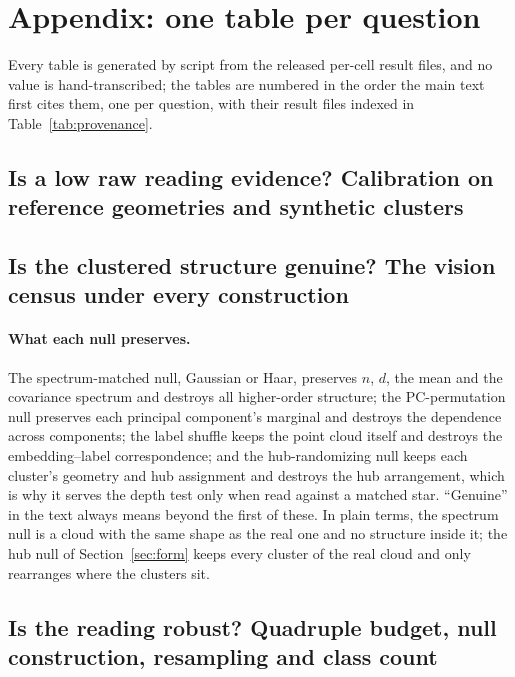 \documentclass{article}
\begin{document}
\FloatBarrier



\clearpage
\appendix
\raggedbottom
\section{Appendix: one table per question}
\label{app:tables}
Every table is generated by script from the released per-cell result files, and no value is hand-transcribed; the tables are numbered in the order the main text first cites them, one per question, with their result files indexed in Table~\ref{tab:provenance}.

\FloatBarrier
\subsection{Is a low raw reading evidence? Calibration on reference geometries and synthetic clusters}
\label{app:calibration}
\label{app:star}


\FloatBarrier
\subsection{Is the clustered structure genuine? The vision census under every construction}
\label{app:census}
\label{app:nulls}
\paragraph{What each null preserves.} The spectrum-matched null, Gaussian or Haar, preserves $n$, $d$, the mean and the covariance spectrum and destroys all higher-order structure; the PC-permutation null preserves each principal component's marginal and destroys the dependence across components; the label shuffle keeps the point cloud itself and destroys the embedding--label correspondence; and the hub-randomizing null keeps each cluster's geometry and hub assignment and destroys the hub arrangement, which is why it serves the depth test only when read against a matched star. ``Genuine'' in the text always means beyond the first of these. In plain terms, the spectrum null is a cloud with the same shape as the real one and no structure inside it; the hub null of Section~\ref{sec:form} keeps every cluster of the real cloud and only rearranges where the clusters sit.


\FloatBarrier
\subsection{Is the reading robust? Quadruple budget, null construction, resampling and class count}
\label{app:robust}
\label{app:csweep}
\end{document}
